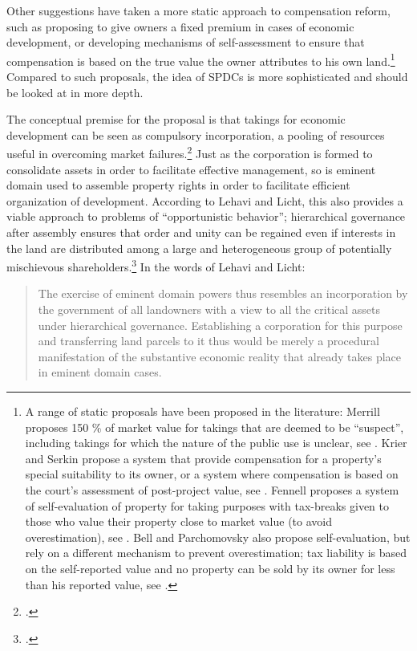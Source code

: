 {Other suggestions have taken a more static approach to compensation reform, such as proposing to give owners a fixed premium in cases of economic development, or developing mechanisms of self-assessment to ensure that compensation is based on the true value the owner attributes to his own land.\footnote{A range of static proposals have been proposed in the literature: Merrill proposes 150 \% of market value for takings that are deemed to be ``suspect'', including takings for which the nature of the public use is unclear, see \cite[90-93]{merrill86}. Krier and Serkin propose a system that provide compensation for a property's special suitability to its owner, or a system where compensation is based on the court's assessment of post-project value, see \cite[865-873]{krier04}. Fennell proposes a system of self-evaluation of property for taking purposes with tax-breaks given to those who value their property close to market value (to avoid overestimation), see \cite[995-996]{fennell04}. Bell and Parchomovsky also propose self-evaluation, but rely on a different mechanism to prevent overestimation; tax liability is based on the self-reported value and no property can be sold by its owner for less than his reported value, see \cite[890-900]{bell07}.} Compared to such proposals, the idea of SPDCs is more sophisticated and should be looked at in more depth. 

The conceptual premise for the proposal is that takings for economic development can be seen as compulsory incorporation, a pooling of resources useful in overcoming market failures.\footcite[1732-1733]{lehavi07} Just as the corporation is formed to consolidate assets in order to facilitate effective management, so is eminent domain used to assemble property rights in order to facilitate efficient organization of development. According to Lehavi and Licht, this also provides a viable approach to problems of ``opportunistic behavior''; hierarchical governance after assembly ensures that order and unity can be regained even if interests in the land are distributed among a large and heterogeneous group of potentially mischievous shareholders.\footcite[1733]{lehavi07} In the words of Lehavi and Licht:

\begin{quote}
The exercise of eminent domain powers thus resembles an incorporation by the government of all landowners with a view to  all the critical assets under hierarchical governance. Establishing a corporation for this purpose and transferring land parcels to it thus would be merely a procedural manifestation of the substantive economic reality that already takes place in eminent domain cases.
\end{quote}

}
